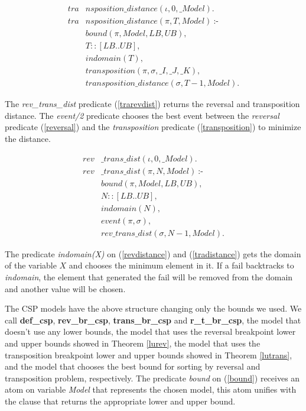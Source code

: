 \begin{align}
  \label{tradistance}
  \textit{tra}&\textit{nsposition\_distance}(\iota, 0, \_Model). \nonumber\\
  \textit{tra}&\textit{nsposition\_distance}(\pi, T, Model)~\text{:-} \nonumber\\
  &\textit{bound}(\pi, Model, LB, UB), \nonumber\\
  &T :: [LB .. UB], \\
  &\textit{indomain}(T), \nonumber \\
  &\textit{transposition}(\pi, \sigma, \_I, \_J, \_K), \nonumber \\
  &\textit{transposition\_distance}(\sigma, T-1, Model). \nonumber
\end{align}

The \textit{rev\_trans\_dist} predicate (\ref{trarevdist}) returns the
reversal and transposition distance. The \textit{event/2} predicate
chooses the best event between the \textit{reversal} predicate
(\ref{reversal}) and the \textit{transposition} predicate
(\ref{transposition}) to minimize the distance.

\begin{align}
  \label{trarevdist}
  \textit{rev}&\textit{\_trans\_dist}(\iota, 0, \_Model). \nonumber\\
  \textit{rev}&\textit{\_trans\_dist}(\pi, N, Model)~\text{:-} \nonumber\\
  &\textit{bound}(\pi, Model, LB, UB), \nonumber\\
  &N :: [LB .. UB], \\
  &\textit{indomain}(N), \nonumber \\
  &\textit{event}(\pi, \sigma), \nonumber \\
  &\textit{rev\_trans\_dist}(\sigma, N-1, Model). \nonumber
\end{align}

The predicate \textit{indomain(X)} on (\ref{revdistance}) and
(\ref{tradistance}) gets the domain of the variable $X$ and chooses the
minimum element in it. If a fail backtracks to \textit{indomain}, the
element that generated the fail will be removed from the domain and
another value will be chosen.

The CSP models have the above structure changing only the bounds we
used. We call \textbf{def\_csp}, \textbf{rev\_br\_csp},
\textbf{trans\_br\_csp} and \textbf{r\_t\_br\_csp}, the model
that doesn't use any lower bounds, the model that uses the reversal
breakpoint lower and upper bounds showed in Theorem \ref{lurev}, the
model that uses the transposition breakpoint lower and upper bounds
showed in Theorem \ref{lutrans}, and the model that chooses the best
bound for sorting by reversal and transposition problem,
respectively. The predicate \textit{bound} on (\ref{bound}) receives
an atom on variable \textit{Model} that represents the chosen model,
this atom unifies with the clause that returns the appropriate lower
and upper bound.

